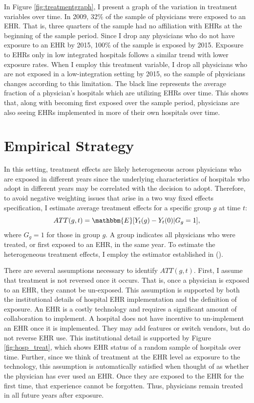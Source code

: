 \documentclass[11pt]{article}
\begin{document}
In Figure \ref{fig:treatmentgraph}, I present a graph of the variation in treatment variables over time. In 2009, 32\% of the sample of physicians were exposed to an EHR. That is, three quarters of the sample had no affiliation with EHRs at the beginning of the sample period. Since I drop any physicians who do not have exposure to an EHR by 2015, 100\% of the sample is exposed by 2015. Exposure to EHRs only in low integrated hospitals follows a similar trend with lower exposure rates. When I employ this treatment variable, I drop all physicians who are not exposed in a low-integration setting by 2015, so the sample of physicians changes according to this limitation. The black line represents the average fraction of a physician's hospitals which are utilizing EHRs over time. This shows that, along with becoming first exposed over the sample period, physicians are also seeing EHRs implemented in more of their own hospitals over time.


\section{Empirical Strategy}

In this setting, treatment effects are likely heterogeneous across physicians who are exposed in different years since the underlying characteristics of hospitals who adopt in different years may be correlated with the decision to adopt. Therefore, to avoid negative weighting issues that arise in a two way fixed effects specification, I estimate average treatment effects for a specific group $g$ at time $t$: 
$$ATT(g,t)=\mathbbm{E}[Y_t(g)-Y_t(0)|G_g=1],$$
where $G_g=1$ for those in group $g$. A group indicates all physicians who were treated, or first exposed to an EHR, in the same year. To estimate the heterogeneous treatment effects, I employ the estimator established in \citeauthor{callaway2021difference} (\citeyear{callaway2021difference}).

There are several assumptions necessary to identify $ATT(g,t)$. First, I assume that treatment is not reversed once it occurs. That is, once a physician is exposed to an EHR, they cannot be un-exposed. This assumption is supported by both the institutional details of hospital EHR implementation and the definition of exposure. An EHR is a costly technology and requires a significant amount of collaboration to implement. A hospital does not have incentive to un-implement an EHR once it is implemented. They may add features or switch vendors, but do not reverse EHR use. This institutional detail is supported by Figure \ref{fig:hosp_treat}, which shows EHR status of a random sample of hospitals over time. Further, since we think of treatment at the EHR level as exposure to the technology, this assumption is automatically satisfied when thought of as whether the physician has ever used an EHR. Once they are exposed to the EHR for the first time, that experience cannot be forgotten. Thus, physicians remain treated in all future years after exposure.
\end{document}
